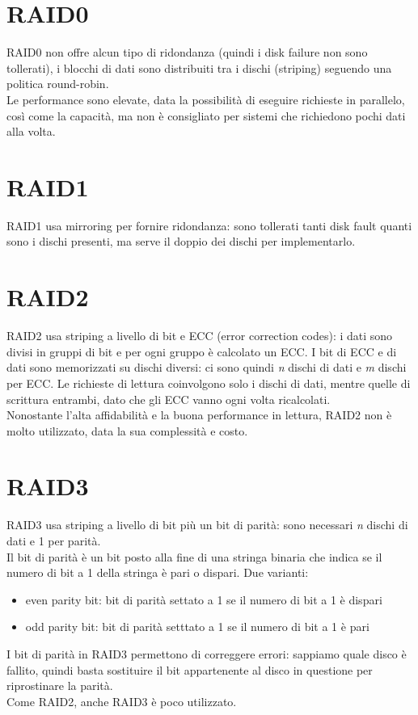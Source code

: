 \documentclass[12pt]{article}
\begin{document}
\section*{RAID0}
RAID0 non offre alcun tipo di ridondanza (quindi i disk failure non sono tollerati), i blocchi di dati sono distribuiti tra i dischi (striping) seguendo una politica round-robin.\\
Le performance sono elevate, data la possibilità di eseguire richieste in parallelo, così come la capacità, ma non è consigliato per sistemi che richiedono pochi dati alla volta.
\section*{RAID1}
RAID1 usa mirroring per fornire ridondanza: sono tollerati tanti disk fault quanti sono i dischi presenti, ma serve il doppio dei dischi per implementarlo.
\section*{RAID2}
RAID2 usa striping a livello di bit e ECC (error correction codes): i dati sono divisi in gruppi di bit e per ogni gruppo è calcolato un ECC.
I bit di ECC e di dati sono memorizzati su dischi diversi: ci sono quindi \textit{n} dischi di dati e \textit{m} dischi per ECC.
Le richieste di lettura coinvolgono solo i dischi di dati, mentre quelle di scrittura entrambi, dato che gli ECC vanno ogni volta ricalcolati.\\
Nonostante l'alta affidabilità e la buona performance in lettura, RAID2 non è molto utilizzato, data la sua complessità e costo.
\section*{RAID3}
RAID3 usa striping a livello di bit più un bit di parità: sono necessari \textit{n} dischi di dati e 1 per parità.\\
Il bit di parità è un bit posto alla fine di una stringa binaria che indica se il numero di bit a 1 della stringa è pari o dispari. Due varianti:
\begin{itemize}
    \item even parity bit: bit di parità settato a 1 se il numero di bit a 1 è dispari
    \item odd parity bit: bit di parità setttato a 1 se il numero di bit a 1 è pari
\end{itemize}
I bit di parità in RAID3 permettono di correggere errori: sappiamo quale disco è fallito, quindi basta sostituire il bit appartenente al disco in questione per riprostinare la parità.\\
Come RAID2, anche RAID3 è poco utilizzato.
\end{document}
